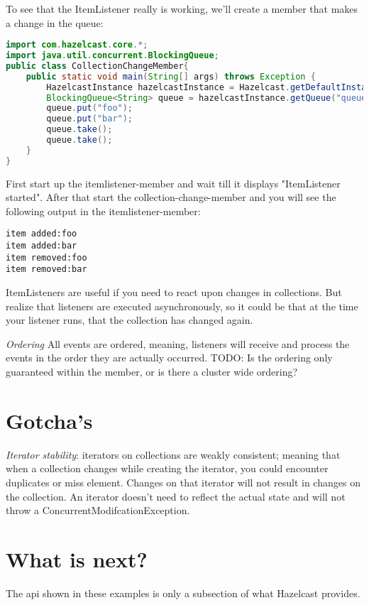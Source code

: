 To see that the ItemListener really is working, we'll create a member that makes a change in the queue:
\begin{lstlisting}[language=java]
import com.hazelcast.core.*;
import java.util.concurrent.BlockingQueue;
public class CollectionChangeMember{
    public static void main(String[] args) throws Exception {
        HazelcastInstance hazelcastInstance = Hazelcast.getDefaultInstance();
        BlockingQueue<String> queue = hazelcastInstance.getQueue("queue");
        queue.put("foo");
        queue.put("bar");
        queue.take();
        queue.take();
    }
}
\end{lstlisting}
First start up the itemlistener-member and wait till it displays "ItemListener started". After that start the collection-change-member and you will see the following output in the itemlistener-member:
\begin{verbatim}
item added:foo
item added:bar
item removed:foo
item removed:bar
\end{verbatim}
ItemListeners are useful if you need to react upon changes in collections. But realize that listeners are executed asynchronously, so it could be that at the time your listener runs, that the collection has changed again. 

\emph{Ordering} All events are ordered, meaning, listeners will receive and process the events in the order they are actually occurred. TODO: Is the ordering only guaranteed within the member, or is there a cluster wide ordering?

\section{Gotcha's}
\emph{Iterator stability}: iterators on collections are weakly consistent; meaning that when a collection changes while creating the iterator, you could encounter duplicates or miss element. Changes on that iterator will not result in changes on the collection. An iterator doesn't need to reflect the actual state and will not throw a ConcurrentModifcationException.

\section{What is next?}
The api shown in these examples is only a subsection of what Hazelcast provides.